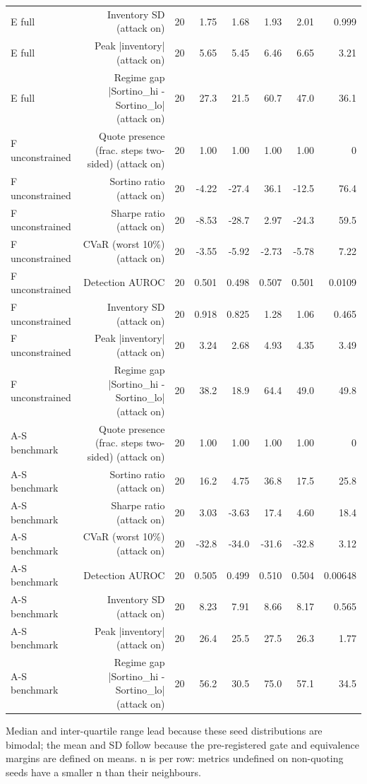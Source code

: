 \begin{table}[htbp]
\begin{tabular}{lrrrrrrr}
    E  full & Inventory SD (attack on) & 20 & 1.75 & 1.68 & 1.93 & 2.01 & 0.999 \\
    E  full & Peak |inventory| (attack on) & 20 & 5.65 & 5.45 & 6.46 & 6.65 & 3.21 \\
    E  full & Regime gap  |Sortino\_hi - Sortino\_lo| (attack on) & 20 & 27.3 & 21.5 & 60.7 & 47.0 & 36.1 \\
    F  unconstrained & Quote presence (frac. steps two-sided) (attack on) & 20 & 1.00 & 1.00 & 1.00 & 1.00 & 0 \\
    F  unconstrained & Sortino ratio (attack on) & 20 & -4.22 & -27.4 & 36.1 & -12.5 & 76.4 \\
    F  unconstrained & Sharpe ratio (attack on) & 20 & -8.53 & -28.7 & 2.97 & -24.3 & 59.5 \\
    F  unconstrained & CVaR (worst 10\%) (attack on) & 20 & -3.55 & -5.92 & -2.73 & -5.78 & 7.22 \\
    F  unconstrained & Detection AUROC & 20 & 0.501 & 0.498 & 0.507 & 0.501 & 0.0109 \\
    F  unconstrained & Inventory SD (attack on) & 20 & 0.918 & 0.825 & 1.28 & 1.06 & 0.465 \\
    F  unconstrained & Peak |inventory| (attack on) & 20 & 3.24 & 2.68 & 4.93 & 4.35 & 3.49 \\
    F  unconstrained & Regime gap  |Sortino\_hi - Sortino\_lo| (attack on) & 20 & 38.2 & 18.9 & 64.4 & 49.0 & 49.8 \\
    A-S benchmark & Quote presence (frac. steps two-sided) (attack on) & 20 & 1.00 & 1.00 & 1.00 & 1.00 & 0 \\
    A-S benchmark & Sortino ratio (attack on) & 20 & 16.2 & 4.75 & 36.8 & 17.5 & 25.8 \\
    A-S benchmark & Sharpe ratio (attack on) & 20 & 3.03 & -3.63 & 17.4 & 4.60 & 18.4 \\
    A-S benchmark & CVaR (worst 10\%) (attack on) & 20 & -32.8 & -34.0 & -31.6 & -32.8 & 3.12 \\
    A-S benchmark & Detection AUROC & 20 & 0.505 & 0.499 & 0.510 & 0.504 & 0.00648 \\
    A-S benchmark & Inventory SD (attack on) & 20 & 8.23 & 7.91 & 8.66 & 8.17 & 0.565 \\
    A-S benchmark & Peak |inventory| (attack on) & 20 & 26.4 & 25.5 & 27.5 & 26.3 & 1.77 \\
    A-S benchmark & Regime gap  |Sortino\_hi - Sortino\_lo| (attack on) & 20 & 56.2 & 30.5 & 75.0 & 57.1 & 34.5 \\
    \bottomrule
  \end{tabular}
  \begin{minipage}{\linewidth}\vspace{4pt}\footnotesize Median and inter-quartile range lead because these seed distributions are bimodal; the mean and SD follow because the pre-registered gate and equivalence margins are defined on means. n is per row: metrics undefined on non-quoting seeds have a smaller n than their neighbours.\end{minipage}
\end{table}
